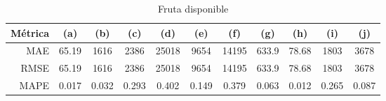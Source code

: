 \documentclass[a4paper,10pt]{article}
\begin{document}
\begin{table}[h!]
 \begin{center}
  \begin{tabular}{|r|c|c|c|c|c|c|c|c|c|c|}
    Métrica & (a) & (b) & (c) & (d) & (e) & (f) & (g) & (h) & (i) & (j) \\ \hline
    MAE & 65.19 & 1616 & 2386 & 25018 & 9654 & 14195 & 633.9 & 78.68 & 1803 & 3678 \\
    RMSE & 65.19 & 1616 & 2386 & 25018 & 9654 & 14195 & 633.9 & 78.68 & 1803 & 3678 \\
    MAPE & 0.017 & 0.032 & 0.293 & 0.402 & 0.149 & 0.379 & 0.063 & 0.012 & 0.265 & 0.087 \\ \hline
  \end{tabular}
  \caption{Fruta disponible}
  \label{tab:btc_prophet_wk}
 \end{center}
\end{table}
\end{document}
